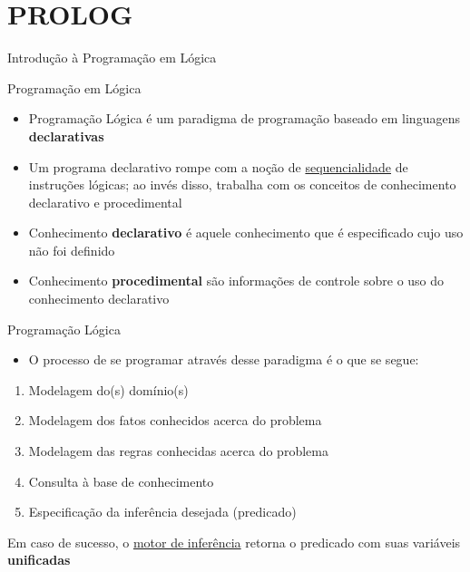 \section{PROLOG} %

\begin{frame}[t]
\vskip 3cm
\begin{center}
{\Huge Introdução à Programação em Lógica}
\end{center}
\end{frame}

\begin{frame}[t]{Programação em Lógica}
	\begin{itemize}
	\item Programação Lógica é um paradigma de programação baseado em linguagens {\bf declarativas}

	\item Um programa declarativo rompe com a noção de \underline{sequencialidade} de instruções lógicas; ao invés disso, trabalha com os conceitos de conhecimento declarativo e procedimental
	
	\item Conhecimento {\bf declarativo} é aquele conhecimento que é especificado cujo uso não foi definido
	
	\item Conhecimento {\bf procedimental} são informações de controle sobre o uso do conhecimento declarativo	
	\end{itemize}
\end{frame}

\begin{frame}[t]{Programação Lógica}
	\begin{itemize}
	\item O processo de se programar através desse paradigma é o que se segue:
	\end{itemize}
	\begin{enumerate}
	\item Modelagem do(s) domínio(s)
	\item Modelagem dos fatos conhecidos acerca do problema
	\item Modelagem das regras conhecidas acerca do problema
	\item Consulta à base de conhecimento
	\item Especificação da inferência desejada (predicado)
	\end{enumerate}
	
	Em caso de sucesso, o \underline{motor de inferência} retorna o predicado com suas variáveis {\bf unificadas}
\end{frame}

